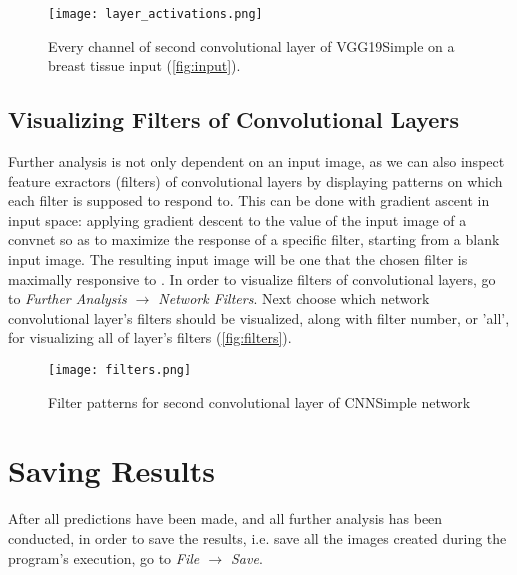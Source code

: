 \begin{figure}[h]
	\centering
	\texttt{[image: layer\_activations.png]}
	\caption{Every channel of second convolutional layer of VGG19Simple on a breast tissue input (\textcolor{red}{\autoref{fig:input}}).}
	\label{fig:interact}
\end{figure}

\subsection{Visualizing Filters of Convolutional Layers}

Further analysis is not only dependent on an input image, as we can also inspect feature exractors (filters) of convolutional layers by displaying patterns on which each filter is supposed to respond to. This can be done with gradient ascent in input space: applying gradient descent to the value of the input image of a convnet so as to maximize the response of a specific filter, starting from a blank input image. The resulting input image will be one that the chosen filter is maximally responsive to \cite{chollet2018deep}. In order to visualize filters of convolutional layers, go to \emph{Further Analysis $\rightarrow$ Network Filters}.  Next choose which network convolutional layer's filters should be visualized, along with filter number, or 'all', for visualizing all of layer's filters  (\textcolor{red}{\autoref{fig:filters}}).

\begin{figure}[h]
	\centering
	\texttt{[image: filters.png]}
	\caption{Filter patterns for second convolutional layer of CNNSimple network}
	\label{fig:filters}
\end{figure}

\section{Saving Results}
After all predictions have been made, and all further analysis has been conducted, in order to save the results, i.e. save all the images created during the program's execution, go to \emph{File $\rightarrow$ Save}.
